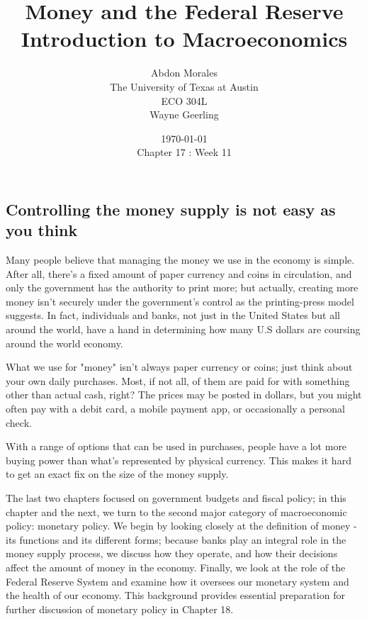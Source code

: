 \documentclass[11pt]{article} %
\title{Money and the Federal Reserve \\ Introduction to Macroeconomics}
\author{Abdon Morales \\ The University of Texas at Austin \\ ECO 304L \\ Wayne Geerling}
\date{\today \\ Chapter 17 : Week 11}
\begin{document}
\maketitle
\subsection*{Controlling the money supply is not easy as you think}
Many people believe that managing the money we use in the economy is simple. After all, there's a fixed amount of paper currency and coins in circulation, and only the government has the authority to print more; but actually, creating more money isn't securely under the government's control as the printing-press model suggests. In fact, individuals and banks, not just in the United States but all around the world, have a hand in determining how many U.S dollars are coursing around the world economy.

What we use for "money" isn't always paper currency or coins; just think about your own daily purchases. Most, if not all, of them are paid for with something other than actual cash, right? The prices may be posted in dollars, but you might often pay with a debit card, a mobile payment app, or occasionally a personal check.

With a range of options that can be used in purchases, people have a lot more buying power than what's represented by physical currency. This makes it hard to get an exact fix on the size of the money supply.

The last two chapters focused on government budgets and fiscal policy; in this chapter and the next, we turn to the second major category of macroeconomic policy: monetary policy. We begin by looking closely at the definition of money - its functions and its different forms; because banks play an integral role in the money supply process, we discuss how they operate, and how their decisions affect the amount of money in the economy. Finally, we look at the role of the Federal Reserve System and examine how it oversees our monetary system and the health of our economy. This background provides essential preparation for further discussion of monetary policy in Chapter 18.
\end{document}
